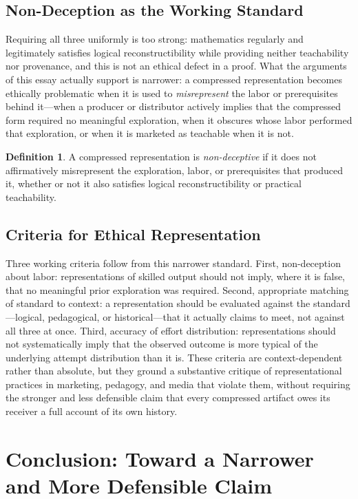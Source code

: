 \documentclass[12pt, a4paper]{article}
\theoremstyle{plain}
\theoremstyle{definition}
\newtheorem{definition}[proposition]{Definition}
\theoremstyle{remark}
\begin{document}
\subsection{Non-Deception as the Working Standard}

Requiring all three uniformly is too strong: mathematics regularly and legitimately satisfies logical reconstructibility while providing neither teachability nor provenance, and this is not an ethical defect in a proof. What the arguments of this essay actually support is narrower: a compressed representation becomes ethically problematic when it is used to \emph{misrepresent} the labor or prerequisites behind it---when a producer or distributor actively implies that the compressed form required no meaningful exploration, when it obscures whose labor performed that exploration, or when it is marketed as teachable when it is not.

\begin{definition}
A compressed representation is \emph{non-deceptive} if it does not affirmatively misrepresent the exploration, labor, or prerequisites that produced it, whether or not it also satisfies logical reconstructibility or practical teachability.
\end{definition}

\subsection{Criteria for Ethical Representation}

Three working criteria follow from this narrower standard. First, non-deception about labor: representations of skilled output should not imply, where it is false, that no meaningful prior exploration was required. Second, appropriate matching of standard to context: a representation should be evaluated against the standard---logical, pedagogical, or historical---that it actually claims to meet, not against all three at once. Third, accuracy of effort distribution: representations should not systematically imply that the observed outcome is more typical of the underlying attempt distribution than it is. These criteria are context-dependent rather than absolute, but they ground a substantive critique of representational practices in marketing, pedagogy, and media that violate them, without requiring the stronger and less defensible claim that every compressed artifact owes its receiver a full account of its own history.

\section{Conclusion: Toward a Narrower and More Defensible Claim}
\label{sec:conclusion}
\end{document}
